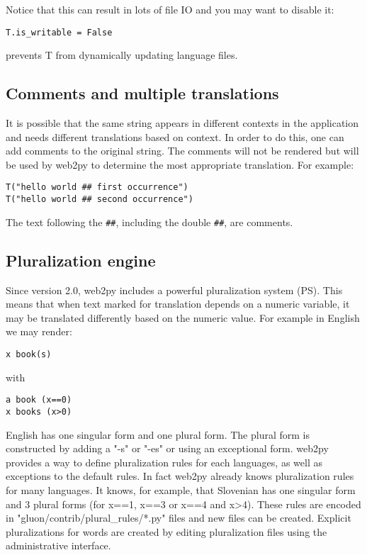 \documentclass[justified,sixbynine,notoc]{tufte-book}
\def\ft{\small\tt}
\begin{document}
\begin{fullwidth}
Notice that this can result in lots of file IO and you may want to disable it:

\begin{lstlisting}
T.is_writable = False
\end{lstlisting}
\noindent prevents T from dynamically updating language files.

\goodbreak\subsection{Comments and multiple translations}

It is possible that the same string appears in different contexts in the application and needs different translations based on context. In order to do this, one can add comments to the original string. The comments will not be rendered but will be used by web2py to determine the most appropriate translation. For example:

\begin{lstlisting}
T("hello world ## first occurrence")
T("hello world ## second occurrence")
\end{lstlisting}

The text following the {\ft \#\#}, including the double {\ft \#\#}, are comments.

\goodbreak\subsection{Pluralization engine}

Since version 2.0, web2py includes a powerful pluralization system (PS). This means that when text marked for translation depends on a numeric variable, it may be translated differently based on the numeric value. For example in English we may render:

\begin{lstlisting}
x book(s)
\end{lstlisting}
\noindent with

\begin{lstlisting}
a book (x==0)
x books (x>0)
\end{lstlisting}

English has one singular form and one plural form. The plural form is constructed by adding a "-s" or "-es" or using an exceptional form. web2py provides a way to define pluralization rules for each languages, as well as exceptions to the default rules. In fact web2py already knows pluralization rules for many languages. It knows, for example, that Slovenian has one singular form and 3 plural forms (for x==1, x==3 or x==4 and x>4). These rules are encoded in "gluon/contrib/plural\_rules/*.py" files and new files can be created. Explicit pluralizations for words are created by editing pluralization files using the administrative interface.


\end{fullwidth}
\end{document}
